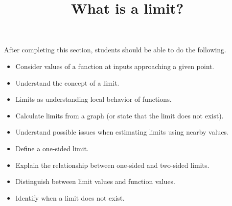 \documentclass{ximera}
\title{What is a limit?}
\begin{document}
\begin{abstract}
\end{abstract}

\maketitle

\begin{sectionOutcomes}
After completing this section, students should be able to do the following.

\begin{itemize}
	\item Consider  values of a function  at inputs approaching a given point.
	\item Understand the concept of a limit.
        \item Limits as understanding local behavior of functions.
	\item Calculate limits from a graph (or state that the limit does not exist).
	\item Understand possible issues when estimating limits using
          nearby values.
	\item Define a one-sided limit.
	\item Explain the relationship between one-sided and two-sided limits.
	\item Distinguish between limit values and function values.
	\item Identify when a limit does not exist.
\end{itemize}
\end{sectionOutcomes}
\end{document}
